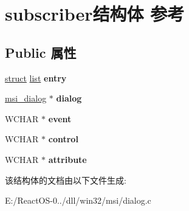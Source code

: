 \hypertarget{structsubscriber}{}\section{subscriber结构体 参考}
\label{structsubscriber}
\subsection*{Public 属性}
\begin{DoxyCompactItemize}
\item 
\mbox{\label{structsubscriber_a413011113a1122f7e7e116a115a0c08f}} 
\hyperlink{interfacestruct}{struct} \hyperlink{classlist}{list} {\bfseries entry}
\item 
\mbox{\label{structsubscriber_ad10c6503652a685ee2dc0db0ef44e90f}} 
\hyperlink{structmsi__dialog__tag}{msi\+\_\+dialog} $\ast$ {\bfseries dialog}
\item 
\mbox{\label{structsubscriber_a5ebc2bebce1cd6ca510404a0751cdb02}} 
W\+C\+H\+AR $\ast$ {\bfseries event}
\item 
\mbox{\label{structsubscriber_abfbf318345557f0fc732317cd2223cfc}} 
W\+C\+H\+AR $\ast$ {\bfseries control}
\item 
\mbox{\label{structsubscriber_a953b9ab58fffa749130c31fa3fce63f8}} 
W\+C\+H\+AR $\ast$ {\bfseries attribute}
\end{DoxyCompactItemize}


该结构体的文档由以下文件生成\+:\begin{DoxyCompactItemize}
\item 
E\+:/\+React\+O\+S-\/0../dll/win32/msi/dialog.\+c\end{DoxyCompactItemize}
